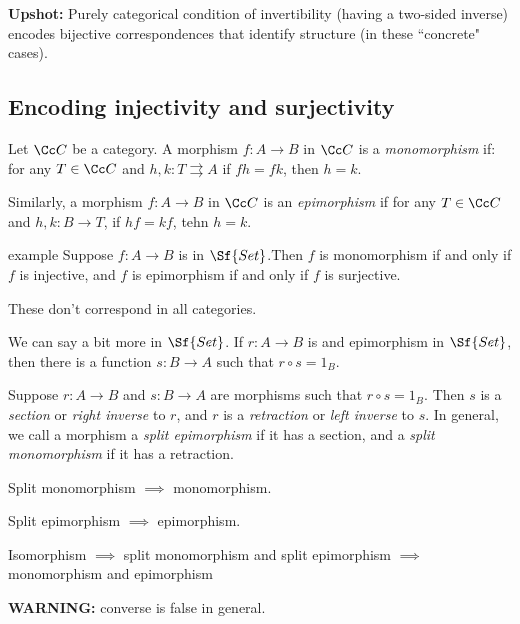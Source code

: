 \documentclass[class=article, crop=false]{standalone}
\begin{document}
\textbf{Upshot:} Purely categorical condition of invertibility (having a two-sided inverse) encodes bijective correspondences that identify structure (in these ``concrete" cases).

\subsection*{Encoding injectivity and surjectivity}

\begin{defn}
  Let $\Cc C$ be a category. A morphism $f\colon A \to B$ in $\Cc C$ is a \emph{monomorphism} if: for any $T \in \Cc C$ and $h,k\colon T \rightrightarrows A$ if $fh = fk$, then $h=k$.

  Similarly, a morphism $f\colon A \to B$ in $\Cc C$ is an \emph{epimorphism} if for any $T \in \Cc C$ and $h,k \colon B \to T$, if $hf = kf$, tehn $h=k$.
\end{defn}

\begin{understandingcheck}{example}
  Suppose $f\colon A\to B$ is in $\Sf{Set}$.Then $f$ is monomorphism if and only if $f$ is injective, and $f$ is epimorphism if and only if $f$ is surjective.
\end{understandingcheck}
\begin{rem}
  These don't correspond in all categories.
\end{rem}

We can say a bit more in $\Sf{Set}$. If $r\colon A \to B$ is and epimorphism in $\Sf{Set}$, then there is a function $s\colon B \to A$ such that $r \circ s = 1_B$.

\begin{defn}
  Suppose $r\colon A \to B$ and $s\colon B \to A$ are morphisms such that $r \circ s = 1_B$. Then $s$ is a \emph{section} or \emph{right inverse} to $r$, and $r$ is a \emph{retraction} or \emph{left inverse} to $s$. In general, we call a morphism a \emph{split epimorphism} if it has a section, and a \emph{split monomorphism} if it has a retraction.
\end{defn}
\begin{rem}
  Split monomorphism $\implies$ monomorphism.
\end{rem}
\begin{rem}
  Split epimorphism $\implies$ epimorphism.
\end{rem}
\begin{rem}
  Isomorphism $\implies$ split monomorphism and split epimorphism $\implies$ monomorphism and epimorphism

  \textbf{WARNING:} converse is false in general.
\end{rem}
\end{document}
